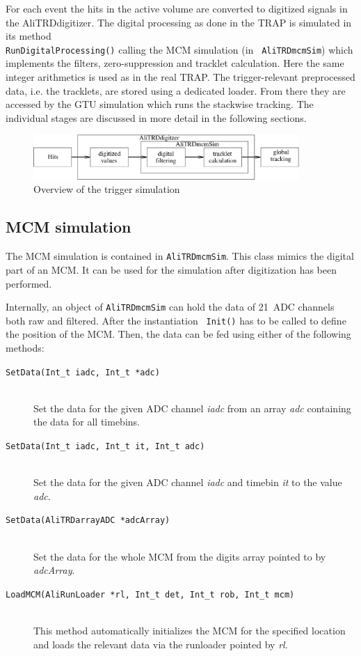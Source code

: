 \documentclass{alicetdr}
\begin{document}
For each event the hits in the active volume are converted to
digitized signals in the AliTRDdigitizer. The digital processing as
done in the TRAP is simulated in its method \\
{\tt RunDigitalProcessing()} calling the MCM simulation (in {\tt
  AliTRDmcmSim}) which implements the filters, zero-suppression and
tracklet calculation. Here the same integer arithmetics is used as in
the real TRAP. The trigger-relevant preprocessed data, i.e. the
tracklets, are stored using a dedicated loader. From there they are
accessed by the GTU simulation which runs the stackwise tracking. The
individual stages are discussed in more detail in the following
sections.
\begin{figure}
\begin{center}
\includegraphics[angle=0,width=0.9\textwidth]{plots/trgsim_ov}
\end{center}
\caption[Trigger simulation overview]{Overview of the trigger
  simulation}
\label{fig:trgsim}
\end{figure}

\subsection{MCM simulation}
The MCM simulation is contained in {\tt AliTRDmcmSim}. This class
mimics the digital part of an MCM. It can be used for the simulation
after digitization has been performed.

Internally, an object of {\tt AliTRDmcmSim} can hold the data of
21~ADC channels both raw and filtered. After the instantiation {\tt
  Init()} has to be called to define the position of the MCM. Then,
the data can be fed using either of the following methods:
\begin{description}
\item[{\tt SetData(Int\_t iadc, Int\_t *adc)}] ~\\ Set the data for the
  given ADC channel {\it iadc} from an array {\it adc} containing the
  data for all timebins.
\item[{\tt SetData(Int\_t iadc, Int\_t it, Int\_t adc)}] ~\\ Set the data for the
  given ADC channel {\it iadc} and timebin {\it it} to the value {\it adc}.
\item[{\tt SetData(AliTRDarrayADC *adcArray)}] ~\\ Set the data for the
  whole MCM from the digits array pointed to by {\it adcArray}.
\item[{\tt LoadMCM(AliRunLoader *rl, Int\_t det, Int\_t rob, Int\_t mcm)}]
  ~\\ This method automatically initializes the MCM for the specified
  location and loads the relevant data via the runloader pointed by
  {\it rl}.
\end{description}
\end{document}
